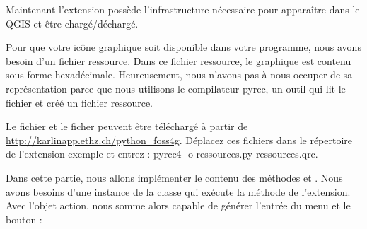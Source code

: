 Maintenant l'extension possède l'infrastructure nécessaire pour apparaître dans le
 QGIS et être
chargé/déchargé.


Pour que votre icône graphique soit disponible dans votre programme, nous avons
besoin d'un fichier ressource. Dans ce fichier ressource, le graphique est
contenu sous forme hexadécimale. Heureusement, nous n'avons pas à nous occuper de
sa représentation parce que nous utilisons le compilateur pyrcc, un outil qui
lit le fichier  et créé un fichier ressource.

Le fichier  et le ficher  peuvent
être téléchargé à partir de \url{http://karlinapp.ethz.ch/python\_foss4g}.
Déplacez ces fichiers dans le répertoire de l'extension exemple
 et entrez : pyrcc4 -o
ressources.py ressources.qrc.


Dans cette partie, nous allons implémenter le contenu des méthodes
 et . Nous avons besoins d'une instance de la
classe  qui exécute la méthode  de l'extension. Avec
l'objet action, nous somme alors capable de générer l'entrée du menu et le
bouton :

